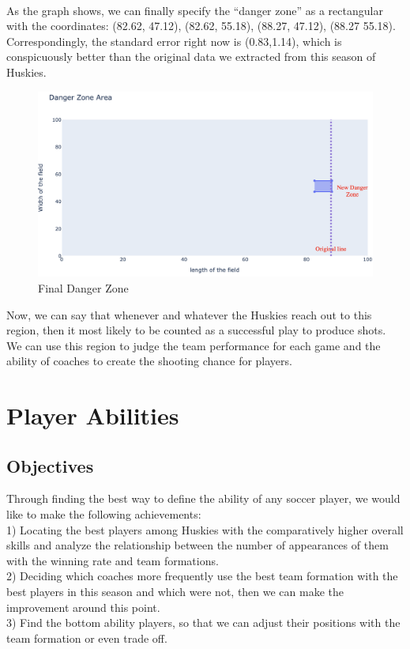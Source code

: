 \documentclass[12pt]{article}
\begin{document}
\\
As the graph shows, we can finally specify the “danger zone” as a rectangular with the coordinates: (82.62, 47.12), (82.62, 55.18), (88.27, 47.12), (88.27 55.18). Correspondingly, the standard error right now is (0.83,1.14), which is conspicuously better than the original data we extracted from this season of Huskies.\\
\begin{figure}[h]
\begin{center}
\includegraphics[scale=0.6]{images/ImprovedDangerZone.png}
\caption{Final Danger Zone}
\end{center}
\end{figure}
\newline
Now, we can say that whenever and whatever the Huskies reach out to this region, then it most likely to be counted as a successful play to produce shots. We can use this region to judge the team performance for each game and the ability of coaches to create the shooting chance for players. 
\section{Player Abilities}
\subsection{Objectives}
Through finding the best way to define the ability of any soccer player, we would like to make the following achievements: \\  1) Locating the best players among Huskies with the comparatively higher overall skills and analyze the relationship between the number of appearances of them with the winning rate and team formations. \\  2) Deciding which coaches more frequently use the best team formation with the best players in this season and which were not, then we can make the improvement around this point. \\ 3) Find the bottom ability players, so that we can adjust their positions with the team formation or even trade off.
\end{document}
